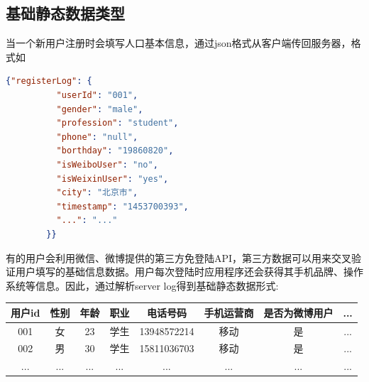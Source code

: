     \subsection{基础静态数据类型}
    当一个新用户注册时会填写人口基本信息，通过json格式从客户端传回服务器，格式如
    \begin{lstlisting}[language=json,firstnumber=1]
        {"registerLog": {
          "userId": "001",
          "gender": "male",
          "profession": "student",
          "phone": "null",
          "borthday": "19860820",
          "isWeiboUser": "no",
          "isWeixinUser": "yes",
          "city": "北京市",
          "timestamp": "1453700393",
          "...": "..."
        }}
    \end{lstlisting}
    有的用户会利用微信、微博提供的第三方免登陆API，第三方数据可以用来交叉验证用户填写的基础信息数据。用户每次登陆时应用程序还会获得其手机品牌、操作系统等信息。因此，通过解析server log得到基础静态数据形式:
      \begin{table}[htp]
      \centering
      \label{tab:tagweight}
      \begin{tabular}{|c|c|c|c|c|c|c|c|} \hline
       用户id & 性别 & 年龄 & 职业 & 电话号码 & 手机运营商 & 是否为微博用户 & ... \\ \hline
       001 & 女 & 23 & 学生 & 13948572214 & 移动 & 是 & ... \\ \hline
       002 & 男 & 30 & 学生 & 15811036703 & 移动 & 是 & ... \\ \hline
       ... & ... & ... & ... & ... & ... & ... & ... \\ \hline
      \end{tabular}
      \end{table}

